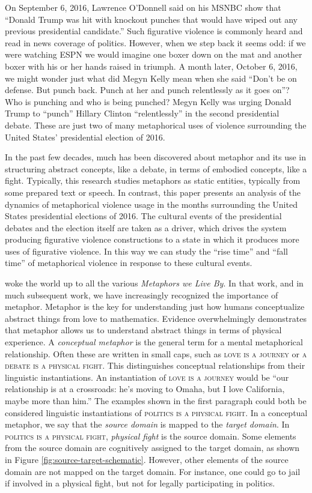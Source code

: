On September 6, 2016, Lawrence O'Donnell said on his MSNBC show that 
``Donald Trump was hit with knockout punches that
would have wiped out any previous presidential candidate.'' Such figurative
violence is commonly heard and read in news coverage of politics. However, when
we step back it seems odd: if we were watching ESPN we would imagine one boxer
down on the mat and another boxer with his or her hands raised in triumph. 
A month later, October 6, 2016, we might wonder just what did Megyn 
Kelly mean when she said ``Don't be on defense. But punch back.
Punch at her and punch relentlessly as it goes on''? Who is punching and
who is being punched? Megyn Kelly was urging Donald Trump to ``punch''
Hillary Clinton ``relentlessly'' in the second presidential debate.
These are just two of many metaphorical uses of violence surrounding the 
United States' presidential election of 2016. 

In the past few decades, much has been discovered about metaphor and its use
in structuring abstract concepts, like a debate, in terms of embodied concepts,
like a fight. Typically, this research studies metaphors as static entities,
typically from some prepared text or speech. In contrast, this paper presents
an analysis of the dynamics of metaphorical violence usage in the months
surrounding the United States presidential elections of 2016. The cultural
events of the presidential debates and the election itself are taken as 
a driver, which drives the system producing figurative violence constructions
to a state in which it produces more uses of figurative violence. In this way
we can study the ``rise time'' and ``fall time'' 
of metaphorical violence in response to these cultural events. 

 woke the world up to all the various 
\textit{Metaphors we Live By}. In that work, and in much subsequent work, 
we have increasingly recognized the importance of metaphor. Metaphor is the key
for understanding just how humans conceptualize abstract things from love to
mathematics. Evidence overwhelmingly demonstrates that metaphor allows us to
understand abstract things in terms of physical experience. A \textit{conceptual
metaphor} is the general term for a mental metaphorical relationship. Often
these are written in small caps, such as \textsc{love is a journey} or 
\textsc{a debate is a physical fight}.
This distinguishes conceptual relationships from their linguistic instantiations.
An instantiation of \textsc{love is a journey} would be ``our relationship is
at a crossroads: he's moving to Omaha, but I love California, maybe more than
him.'' The examples shown in the first paragraph could both be considered
linguistic instantiations of \textsc{politics is a physical fight}. In a conceptual
metaphor, we say that the \textit{source domain} is mapped to the \textit{target
domain}. In \textsc{politics is a physical fight}, \textit{physical fight}
is the source domain. Some elements from the source domain are cognitively
assigned to the target domain, as shown in Figure \ref{fig:source-target-schematic}.
However, other elements of the source domain are not mapped on the target domain.
For instance, one could go to jail if involved in a physical fight, but not for
legally participating in politics.

